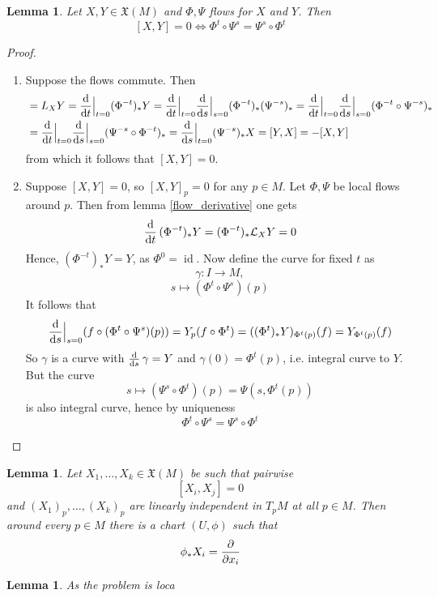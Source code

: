 \documentclass{article}
\numberwithin{theorem}{section}
\newtheorem{lemma}[theorem]{Lemma}
\newcommand{\1}{\mathds{1}}
\DeclareMathOperator{\id}{id}
\begin{document}
\begin{lemma}
    Let $X,Y \in \mathfrak{X}(M)$ and $\Phi, \Psi$ flows for $X$ and $Y$. Then 
    \[ [X,Y ] = 0 \Leftrightarrow \Phi^t \circ \Psi^s = \Psi^s \circ \Phi^t \]
\end{lemma}
\begin{proof}
    \begin{enumerate}
        \item Suppose the flows commute. Then 
        \begin{align}
            [X,Y] &= L_XY = \dv{}{t}\Big|_{t=0} (\Phi^{-t})_* Y =  \dv{}{t}\Big|_{t=0} \dv{}{s}\Big|_{s=0}(\Phi^{-t})_* (\Psi^{-s})_*  = \dv{}{t}\Big|_{t=0} \dv{}{s}\Big|_{s=0}(\Phi^{-t} \circ \Psi^{-s})_*  \\ &= \dv{}{t}\Big|_{t=0} \dv{}{s}\Big|_{s=0}(\Psi^{-s} \circ \Phi^{-t})_*  = \dv{}{s}\Big|_{t=0} (\Psi^{-s})_* X   = [Y,X] = -[X,Y]
        \end{align}
        from which it follows that $[X,Y] = 0 $.  
        \item Suppose $[X,Y] = 0 $, so $[X,Y]_p = 0 $ for any $p \in M$. Let $\Phi, \Psi$ be local flows around $p$.  Then from lemma \ref{flow_derivative} one gets 
        \[ \dv{}{t}\, (\Phi^{-t})_* Y = (\Phi^{-t})_* \mathcal{L}_XY = 0  \]
        Hence, $(\Phi^{-t})_*Y =Y $, as $\Phi^{0} = \id $.  
        Now define the curve for fixed $t$ as 
        \[ \gamma : I \to M, \] 
        \[ s \mapsto (\Phi^t  \circ \Psi^s)(p) \]
        It follows that 
        \[ \dv{}{s}\Big|_{s=0} ( f\circ (\Phi^t \circ \Psi^s)(p)) = Y_p(f \circ \Phi^t) = ((\Phi^t)_*Y)_{\Phi^{t}(p)}(f)  = Y_{\Phi^{t}(p)}(f) \]
        So $\gamma$ is a curve with $\dv{}{s} \, \gamma = Y$ and $\gamma(0) = \Phi^t(p)$, i.e. integral curve to $Y$. But the curve 
        \[ s \mapsto (\Psi^s \circ \Phi^t)(p) = \Psi(s, \Phi^t(p))\] 
         is also integral curve, hence by uniqueness 
        \[ \Phi^t \circ \Psi^s = \Psi^s \circ \Phi^t \] 
    \end{enumerate}
\end{proof}

\begin{lemma}
    Let $X_1, \dots, X_k \in \mathfrak{X}(M)$ be such that pairwise 
    \[ [X_i, X_j]  = 0 \]
    and $(X_1)_p, \dots, (X_k)_p $ are linearly independent in $T_pM$ at all $p \in M$. Then around every $ p \in M$ there is a chart $(U, \phi)$ such that 
    \[ \phi_* X_i = \pdv{}{x_i}\]
\end{lemma}

\begin{lemma}
    As the problem is loca
\end{lemma}
\end{document}
